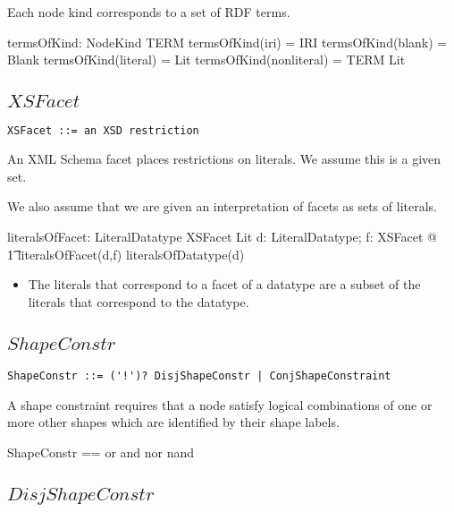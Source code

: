 \documentclass{article}
\begin{document}
Each node kind corresponds to a set of RDF terms.
\begin{axdef}
	termsOfKind: NodeKind \fun \power TERM
\where
	termsOfKind(iri) = IRI
\also
	termsOfKind(blank) = Blank
\also
	termsOfKind(literal) = Lit
\also
	termsOfKind(nonliteral) = TERM \setminus Lit
\end{axdef}

\subsection{$XSFacet$}

\begin{verbatim}
XSFacet ::= an XSD restriction
\end{verbatim}

An XML Schema facet places restrictions on literals.
We assume this is a given set.
\begin{zed}
	[XSFacet]
\end{zed}

We also assume that we are given an interpretation of facets as sets of literals.
\begin{axdef}
	literalsOfFacet: LiteralDatatype \cross XSFacet \fun \power Lit
\where
	\forall d: LiteralDatatype; f: XSFacet @ \\
\t1		literalsOfFacet(d,f) \subseteq literalsOfDatatype(d)
\end{axdef}
\begin{itemize}
\item The literals that correspond to a facet of a datatype are a subset of the literals that correspond to the datatype.
\end{itemize}

\subsection{$ShapeConstr$}

\begin{verbatim}
ShapeConstr ::= ('!')? DisjShapeConstr | ConjShapeConstraint
\end{verbatim}

A shape constraint requires that a node satisfy logical combinations of one or more other shapes which are identified by their shape labels.
\begin{zed}
	ShapeConstr == \ran or \cup \ran and \cup \ran nor \cup \ran nand
\end{zed}

\subsection{$DisjShapeConstr$}
\end{document}
